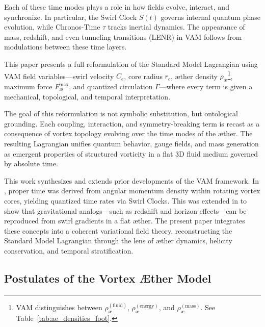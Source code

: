 Each of these time modes plays a role in how fields evolve, interact, and synchronize. In particular, the Swirl Clock $S(t)$ governs internal quantum phase evolution, while Chronos-Time $\tau$ tracks inertial dynamics. The appearance of mass, redshift, and even tunneling transitions (LENR) in VAM follows from modulations between these time layers.

This paper presents a full reformulation of the Standard Model Lagrangian using VAM field variables—swirl velocity $C_e$, core radius $r_c$, æther density $\rho_\text{\ae}$\footnote{VAM distinguishes between $\rho_\text{\ae}^{(\text{fluid})}$, $\rho_\text{\ae}^{(\text{energy})}$, and $\rho_\text{\ae}^{(\text{mass})}$. See Table~\ref{tab:ae_densities_foot}.}, maximum force $F^{\text{max}}_{\text{\ae}}$, and quantized circulation $\Gamma$—where every term is given a mechanical, topological, and temporal interpretation.

The goal of this reformulation is not symbolic substitution, but ontological grounding. Each coupling, interaction, and symmetry-breaking term is recast as a consequence of vortex topology evolving over the time modes of the æther. The resulting Lagrangian unifies quantum behavior, gauge fields, and mass generation as emergent properties of structured vorticity in a flat 3D fluid medium governed by absolute time.

This work synthesizes and extends prior developments of the VAM framework. In \cite{iskandarani2025timedilation}, proper time was derived from angular momentum density within rotating vortex cores, yielding quantized time rates via Swirl Clocks. This was extended in \cite{iskandarani2025swirlgravity} to show that gravitational analogs—such as redshift and horizon effects—can be reproduced from swirl gradients in a flat æther. The present paper integrates these concepts into a coherent variational field theory, reconstructing the Standard Model Lagrangian through the lens of æther dynamics, helicity conservation, and temporal stratification.

\subsection*{Postulates of the Vortex Æther Model}

